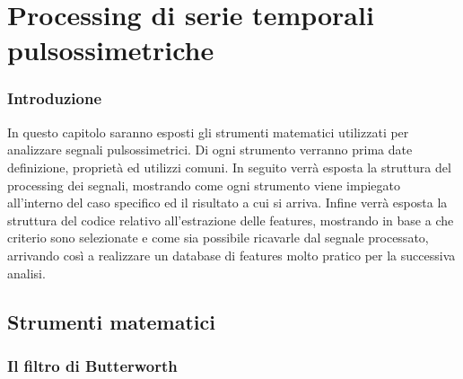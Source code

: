 \documentclass[12pt,a4paper, twoside, openright]{report}
\begin{document}
\chapter{Processing di serie temporali pulsossimetriche}


\subsection{Introduzione}

In questo capitolo saranno esposti gli strumenti matematici utilizzati per analizzare segnali pulsossimetrici.
Di ogni strumento verranno prima date definizione, proprietà ed utilizzi comuni.
In seguito verrà esposta la struttura del processing dei segnali, mostrando come ogni strumento viene impiegato all'interno del caso specifico ed il risultato a cui si arriva.
Infine verrà esposta la struttura del codice relativo all'estrazione delle features, mostrando in base a che criterio sono selezionate e come sia possibile ricavarle dal segnale processato, arrivando così a realizzare un database di features molto pratico per la successiva analisi.


\section{Strumenti matematici}


\subsection{Il filtro di Butterworth}
\end{document}
